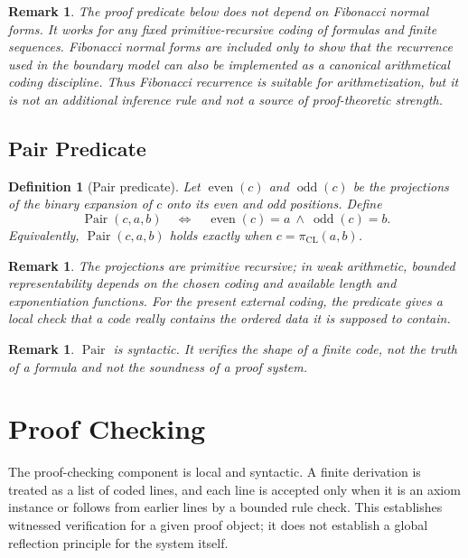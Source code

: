 \documentclass[letterpaper,10pt]{article}
\theoremstyle{upright}
\theoremstyle{upright}
\newtheorem{remark}[theorem]{Remark}
\newtheorem{definition}[theorem]{Definition}
\begin{document}
\begin{remark}
	The proof predicate below does not depend on Fibonacci normal forms. It works for any fixed primitive-recursive coding of formulas and finite sequences. Fibonacci normal forms are included only to show that the recurrence used in the boundary model can also be implemented as a canonical arithmetical coding discipline. Thus Fibonacci recurrence is suitable for arithmetization, but it is not an additional inference rule and not a source of proof-theoretic strength.
\end{remark}

\subsection{Pair Predicate}\label{subsec:pair-predicate}

\begin{definition}[Pair predicate]
	Let $\operatorname{even}(c)$ and $\operatorname{odd}(c)$ be the projections of the binary expansion of $c$ onto its even and odd positions. Define
	\begin{equation}
		\operatorname{Pair}(c,a,b)\quad\Longleftrightarrow\quad \operatorname{even}(c)=a\ \wedge\ \operatorname{odd}(c)=b.
	\end{equation}
	Equivalently, $\operatorname{Pair}(c,a,b)$ holds exactly when $c=\pi_{\mathrm{CL}}(a,b)$.
\end{definition}

\begin{remark}
	The projections are primitive recursive; in weak arithmetic, bounded representability depends on the chosen coding and available length and exponentiation functions. For the present external coding, the predicate gives a local check that a code really contains the ordered data it is supposed to contain.
\end{remark}

\begin{remark}
	$\operatorname{Pair}$ is syntactic. It verifies the shape of a finite code, not the truth of a formula and not the soundness of a proof system.
\end{remark}

\section{Proof Checking}\label{sec:proof-checking}

The proof-checking component is local and syntactic. A finite derivation is treated as a list of coded lines, and each line is accepted only when it is an axiom instance or follows from earlier lines by a bounded rule check. This establishes witnessed verification for a given proof object; it does not establish a global reflection principle for the system itself.
\end{document}
